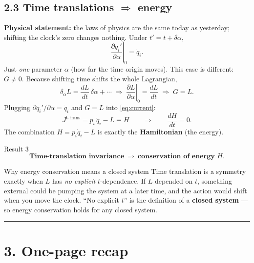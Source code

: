 \documentclass[11pt]{article}
\newcommand{\dd}[2]{\frac{\partial #1}{\partial #2}}
\newcommand{\ddt}[1]{\frac{d#1}{dt}}
\begin{document}
\subsection*{2.3 Time translations $\Rightarrow$ energy}

\textbf{Physical statement:} the laws of physics are the same today as
yesterday; shifting the clock's zero changes nothing. Under $t'=t+\delta\alpha$,
\begin{equation}
\left.\dd{q_i'}{\alpha}\right|_{0}=\dot q_i .
\end{equation}
Just \emph{one} parameter $\alpha$ (how far the time origin moves). This case is
different: $G\neq 0$. Because shifting time shifts the whole Lagrangian,
\begin{equation}
\delta_\alpha L = \ddt{L}\,\delta\alpha+\cdots
\;\Longrightarrow\; \left.\dd{L}{\alpha}\right|_0=\ddt{L}
\;\Longrightarrow\; G = L .
\end{equation}
Plugging $\partial q_i'/\partial\alpha=\dot q_i$ and $G=L$ into \eqref{eq:current}:
\begin{equation}
J^{\text{t-trans}} = p_i\,\dot q_i - L \equiv H
\qquad\Longrightarrow\qquad \ddt{H}=0 .
\end{equation}
The combination $H=p_i\dot q_i-L$ is exactly the \textbf{Hamiltonian} (the
energy).

\begin{keybox}{Result 3}
\[
\textbf{Time-translation invariance}\ \Longrightarrow\ \textbf{conservation of energy }H .
\]
\end{keybox}

\begin{watchbox}{Why energy conservation means a closed system}
Time translation is a symmetry exactly when $L$ has \emph{no explicit}
$t$-dependence. If $L$ depended on $t$, something external could be pumping the
system at a later time, and the action would shift when you move the clock.
``No explicit $t$'' is the definition of a \textbf{closed system} --- so energy
conservation holds for any closed system.
\end{watchbox}

\bigskip
\hrule
\bigskip

\section*{3. One-page recap}
\end{document}
